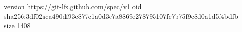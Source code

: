 version https://git-lfs.github.com/spec/v1
oid sha256:3df02aca490df93e877c1a0d3c7a8869e278795107fc7b75f9c8d0a1d5f4bdfb
size 1408

